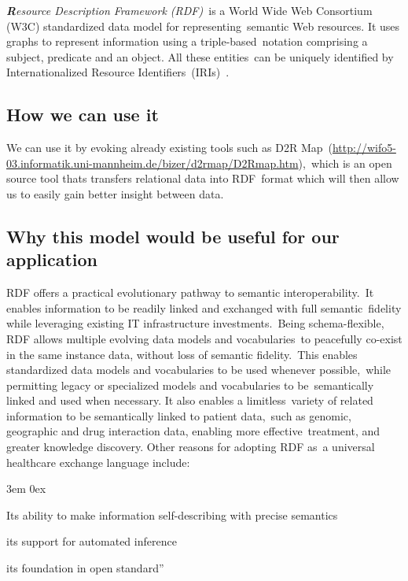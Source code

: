 \documentclass[DIV=calc, paper=a4, fontsize=12pt, onecolumn]{scrartcl}	 %
\newcommand{\initial}[1]{ %
\lettrine[lines=3,lhang=0.3,nindent=0em,slope=0em]{
\color{DarkBlue}
{\textbf{\textit{#1}}}}{}}
\begin{document}
  \initial{R}\textit{esource Description Framework (RDF)}\
  is a World Wide Web Consortium (W3C) standardized data model for representing\
  semantic Web resources. It uses graphs to represent information using a triple-based\
  notation comprising a subject, predicate and an object. All these entities\
  can be uniquely identified by Internationalized Resource Identifiers\
  (IRIs)~\citep{pathak_applying_2012}.

  \subsection{How we can use it}

  We can use it by evoking already existing tools such as D2R Map\
  (\url{http://wifo5-03.informatik.uni-mannheim.de/bizer/d2rmap/D2Rmap.htm}),\
  which is an open source tool thats transfers relational data into RDF\
  format which will then allow us to easily gain better insight between data.\

  \subsection{Why this model would be useful for our application}

  RDF offers a practical evolutionary pathway to semantic interoperability.\
  It enables information to be readily linked and exchanged with full semantic\
  fidelity while leveraging existing IT infrastructure investments.\
  Being schema-flexible, RDF allows multiple evolving data models and vocabularies\
  to peacefully co-exist in the same instance data, without loss of semantic fidelity.\
  This enables standardized data models and vocabularies to be used whenever possible,\ 
  while permitting legacy or specialized models and vocabularies to be\
  semantically linked and used when necessary. It also enables a limitless\
  variety of related information to be semantically linked to patient data,\
  such as genomic, geographic and drug interaction data, enabling more effective\
  treatment, and greater knowledge discovery. Other reasons for adopting RDF as\
  a universal healthcare exchange language include:\

  \begin{description}
  \itemindent3em
  \itemsep0ex
  \item[(a)]  Its ability to make information self-describing with precise semantics
  \item[(b)] its support for automated inference
  \item[(c)]  its foundation in open standard''
  \end{description}
\end{document}
